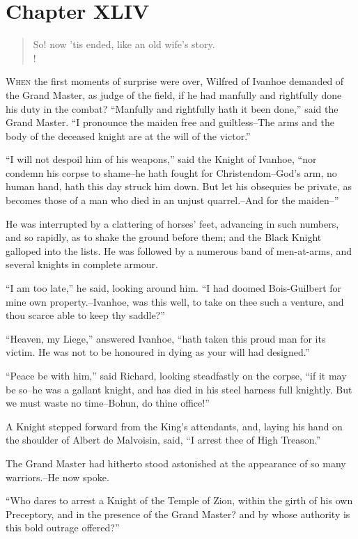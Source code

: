 \chapter{Chapter XLIV}

\begin{verse}
So! now 'tis ended, like an old wife's story.\\!
\end{verse}

\lettrine{W}{hen} the first moments of surprise were over, Wilfred
of Ivanhoe
demanded of the Grand Master, as judge of the field, if he had manfully
and rightfully done his duty in the combat? ``Manfully and rightfully
hath it been done,'' said the Grand Master. ``I pronounce the maiden
free and guiltless--The arms and the body of the deceased knight are at
the will of the victor.''

``I will not despoil him of his weapons,'' said the Knight of Ivanhoe,
``nor condemn his corpse to shame--he hath fought for Christendom--God's
arm, no human hand, hath this day struck him down. But let his obsequies
be private, as becomes those of a man who died in an unjust
quarrel.--And for the maiden--''

He was interrupted by a clattering of horses' feet, advancing in such
numbers, and so rapidly, as to shake the ground before them; and the
Black Knight galloped into the lists. He was followed by a numerous band
of men-at-arms, and several knights in complete armour.

``I am too late,'' he said, looking around him. ``I had doomed
Bois-Guilbert for mine own property.--Ivanhoe, was this well, to take on
thee such a venture, and thou scarce able to keep thy saddle?''

``Heaven, my Liege,'' answered Ivanhoe, ``hath taken this proud man for
its victim. He was not to be honoured in dying as your will had
designed.''

``Peace be with him,'' said Richard, looking steadfastly on the corpse,
``if it may be so--he was a gallant knight, and has died in his steel
harness full knightly. But we must waste no time--Bohun, do thine
office!''

A Knight stepped forward from the King's attendants, and, laying his
hand on the shoulder of Albert de Malvoisin, said, ``I arrest thee of
High Treason.''

The Grand Master had hitherto stood astonished at the appearance of so
many warriors.--He now spoke.

``Who dares to arrest a Knight of the Temple of Zion, within the girth
of his own Preceptory, and in the presence of the Grand Master? and by
whose authority is this bold outrage offered?''

